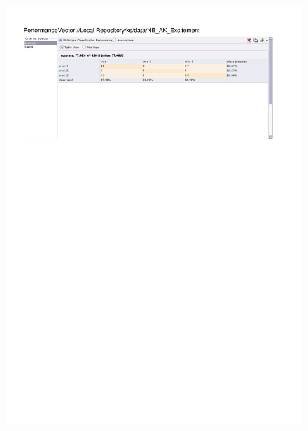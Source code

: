 \begin{figure}[htp]
  \centerline{\includegraphics[trim=0 680 0 60,clip,width=16.09cm]{results/NB_A_Excitement.pdf}} \caption{
} \label{NB_K_Excitement}
\end{figure}

